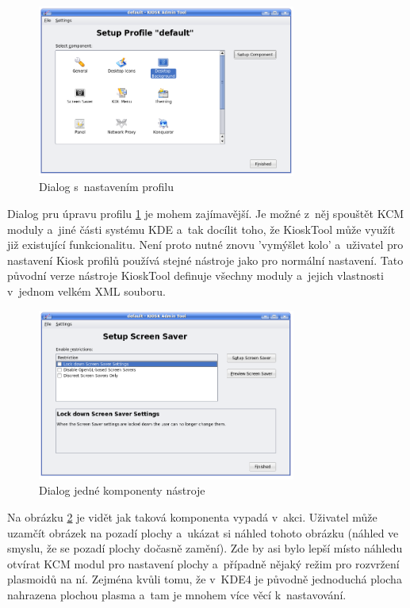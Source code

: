 \begin{figure}[h]
    \centering
    \includegraphics[width=8.5cm]{obrazky/KioskToolKDE3/seznam_komponent.png}
    \caption{Dialog s~nastavením profilu}
    \label{fig:kt3_nast_prof}
\end{figure}
Dialog pru úpravu profilu \ref{fig:kt3_nast_prof} je mohem zajímavější. Je možné
z~něj spouštět KCM moduly a~jiné části systému KDE a~tak docílit toho,
že KioskTool může využít již existující funkcionalitu. Není proto nutné znovu
'vymýšlet kolo' a~uživatel pro nastavení Kiosk profilů používá stejné nástroje
jako pro normální nastavení. Tato původní verze nástroje KioskTool definuje
všechny moduly a~jejich vlastnosti v~jednom velkém XML souboru.

\begin{figure}[h]
    \centering
    \includegraphics[width=8.5cm]{obrazky/KioskToolKDE3/ukazka_komponenty.png}
    \caption{Dialog jedné komponenty nástroje}
    \label{fig:kt3_nast_komp}
\end{figure}
Na obrázku \ref{fig:kt3_nast_komp} je vidět jak taková komponenta vypadá
v~akci. Uživatel může uzamčít obrázek na pozadí plochy a~ukázat si náhled tohoto
obrázku (náhled ve smyslu, že se pozadí plochy dočasně zamění). Zde by asi bylo
lepší místo náhledu otvírat KCM modul pro nastavení plochy a~případně nějaký
režim pro rozvržení plasmoidů  na ní. Zejména kvůli tomu, že v~KDE4 je původně %
jednoduchá plocha nahrazena plochou plasma a~tam je mnohem více věcí
k~nastavování.

